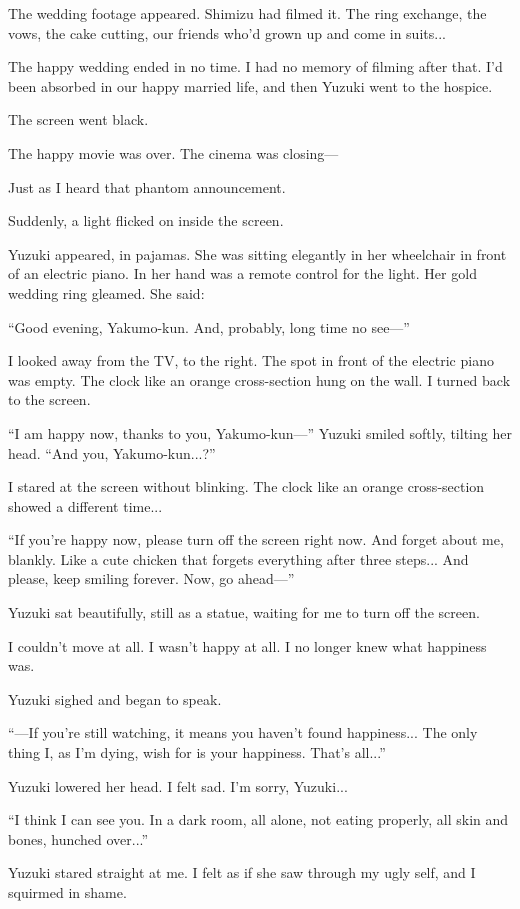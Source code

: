 \documentclass[
    a4paper,
    12pt,
    twoside,
    openany,
    UTF8,
    fontset=windows
]{ctexbook}
\begin{document}
The wedding footage appeared. Shimizu had filmed it. The ring exchange, the vows, the cake cutting, our friends who'd grown up and come in suits...

The happy wedding ended in no time. I had no memory of filming after that. I'd been absorbed in our happy married life, and then Yuzuki went to the hospice.

The screen went black.

The happy movie was over. The cinema was closing---

Just as I heard that phantom announcement.

Suddenly, a light flicked on inside the screen.

Yuzuki appeared, in pajamas. She was sitting elegantly in her wheelchair in front of an electric piano. In her hand was a remote control for the light. Her gold wedding ring gleamed. She said:

``Good evening, Yakumo-kun. And, probably, long time no see---''

I looked away from the TV, to the right. The spot in front of the electric piano was empty. The clock like an orange cross-section hung on the wall. I turned back to the screen.

``I am happy now, thanks to you, Yakumo-kun---'' Yuzuki smiled softly, tilting her head. ``And you, Yakumo-kun...?''

I stared at the screen without blinking. The clock like an orange cross-section showed a different time...

``If you're happy now, please turn off the screen right now. And forget about me, blankly. Like a cute chicken that forgets everything after three steps... And please, keep smiling forever. Now, go ahead---''

Yuzuki sat beautifully, still as a statue, waiting for me to turn off the screen.

I couldn't move at all. I wasn't happy at all. I no longer knew what happiness was.

Yuzuki sighed and began to speak.

``---If you're still watching, it means you haven't found happiness... The only thing I, as I'm dying, wish for is your happiness. That's all...''

Yuzuki lowered her head. I felt sad. I'm sorry, Yuzuki...

``I think I can see you. In a dark room, all alone, not eating properly, all skin and bones, hunched over...''

Yuzuki stared straight at me. I felt as if she saw through my ugly self, and I squirmed in shame.
\end{document}
